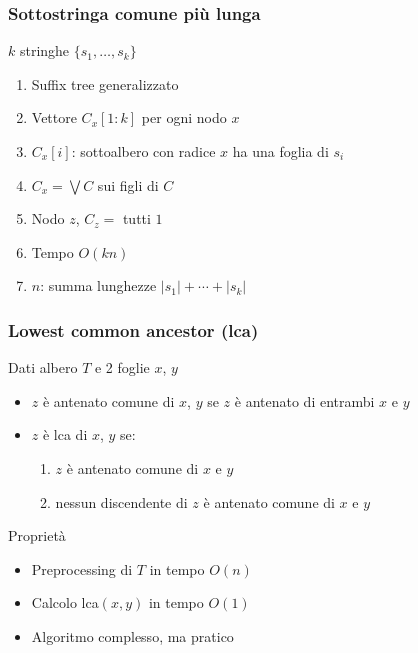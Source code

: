 \begin{frame}[fragile]
\frametitle{Sottostringa comune più lunga}
\begin{block}{$k$ stringhe $\{s_{1}, \ldots , s_{k}\}$}
\begin{enumerate}[<+->]
\item
Suffix tree generalizzato
\item
Vettore $C_{x}[1:k]$ per ogni nodo $x$
\item
$C_{x}[i]$: sottoalbero con radice $x$ ha una foglia di $s_{i}$
\item
$C_{x} = \bigvee C$ sui figli di $C$
\item
Nodo $z$, $C_{z}=$ tutti ${1}$
\item
Tempo $O(kn)$
\item
$n$: summa lunghezze $|s_{1}| + \cdots + |s_{k}|$
\end{enumerate}
\end{block}
\end{frame}


\begin{frame}[fragile]
\frametitle{Lowest common ancestor (lca)}
\begin{block}{Dati albero $T$ e 2 foglie $x$, $y$}
\begin{itemize}
\item
$z$ è antenato comune di $x$, $y$ se
$z$ è antenato di entrambi $x$ e $y$
\item
$z$ è lca di $x$, $y$ se:
\begin{enumerate}
\item
$z$ è antenato comune di $x$ e $y$
\item
nessun discendente di $z$ è antenato comune di $x$ e $y$
\end{enumerate}
\end{itemize}
\end{block}
\begin{block}{Proprietà}
\begin{itemize}
\item
Preprocessing di $T$ in tempo $O(n)$
\item
Calcolo lca$(x,y)$ in tempo $O(1)$
\item
Algoritmo complesso, ma pratico
\end{itemize}
\end{block}
\end{frame}

